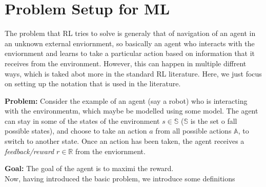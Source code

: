 \section{Problem Setup for ML}
The problem that RL tries to solve is generaly that of navigation of an agent in an unknown external enviornment, so basically an agent who interacts with the enviornment and learns to take a particular action based on information that it receives from the environment. However, this can happen in multiple diffrent ways, which is taked abot more in the standard RL literature. Here, we just focus on setting up the notation that is used in the literature.\\
\par
\textbf{Problem:} Consider the example of an agent (say a robot) who is interacting with the environmentm, which maybe be modelled using some model. The agent can stay in some of the states of the environment $s \in \mathds{S}$ ($\mathds{S}$ is the set o fall possible states), and choose to take an action $a$ from all possible actions  $\mathds{A}$, to switch to another state. Once an action has been taken, the agent receives a \textit{feedback/reward} $r \in \mathds{R}$ from the enviornment.\\
\par
{\color{red}\textbf{Goal:} The goal of the agent is to maximi the reward.}
\\
Now, having introduced the basic problem, we introduce some definitions
